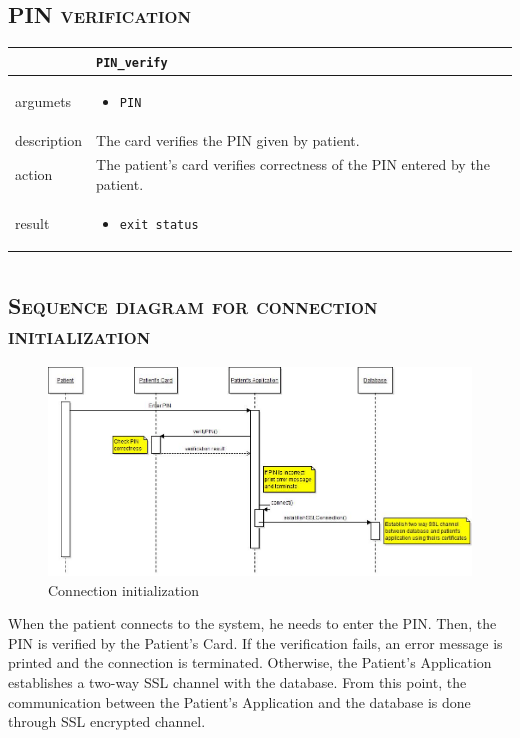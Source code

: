 \section{\textsc{PIN verification}}

\begin{tabularx}{\textwidth}{ |p{2.5cm}|X| }
	\hline
	 &  \texttt{PIN\_verify}\\
\hline	
argumets & 
\begin{itemize}
\item \texttt{PIN}
\end{itemize} \\
\hline
description & 
The card verifies the PIN given by patient.\\
\hline
action & 
The patient's card verifies correctness of the PIN entered by the patient.\\
\hline
result &
\begin{itemize}
\item \texttt{exit status}
\end{itemize}\\
\hline
\end{tabularx}


\newpage

\chapter {}

\FloatBarrier
\section{\textsc{Sequence diagram for connection initialization}}

\begin{figure}[!h]
\includegraphics[width=\linewidth]{patient/initializeConnectionSequenceDiagram}
\caption{Connection initialization}	
\end{figure}
When the patient connects to the system, he needs to enter the PIN. 
Then, the PIN is verified by the Patient’s Card. 
If the verification fails, an error message is printed and the connection is terminated. 
Otherwise, the Patient’s Application establishes a two-way SSL channel with the database. 
From this point, the communication between the Patient’s Application and the database is done through SSL encrypted channel.

